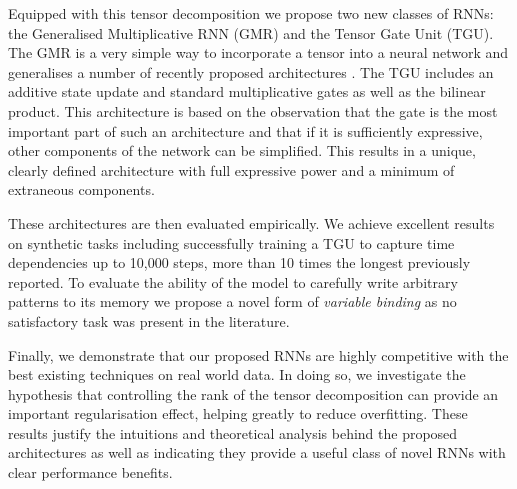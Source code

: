 Equipped with this tensor decomposition we propose two new classes of RNNs: the Generalised
Multiplicative RNN (GMR) and the Tensor Gate Unit (TGU).
The GMR is a very simple way to incorporate a tensor into a neural network and generalises a number of
recently proposed architectures \autocite{Martens2011a, Wu2016}. The TGU includes an
additive state update and standard multiplicative gates as well as the bilinear product. 
This architecture is based on the observation that the gate is the most important part of such an architecture
and that if it is sufficiently expressive, other components of the network can be simplified. This
results in a unique, clearly defined architecture with full expressive power and a minimum of extraneous
components.

These architectures are then evaluated empirically. We achieve
excellent results on synthetic tasks
including successfully training a TGU to capture time dependencies up to 10,000 steps,
more than 10 times the longest previously reported. To evaluate the ability of the model to carefully
write arbitrary patterns to its memory we propose a novel form of \emph{variable binding} as no
satisfactory task was present in the literature.

Finally, we demonstrate that our proposed RNNs are highly competitive with the best existing techniques
on real world data. In doing so, we investigate the hypothesis that controlling the rank of the tensor
decomposition can provide an important regularisation effect, helping greatly to reduce overfitting.
These results justify the intuitions and theoretical analysis behind the proposed architectures
as well as indicating they provide a useful class of novel RNNs with clear performance benefits.